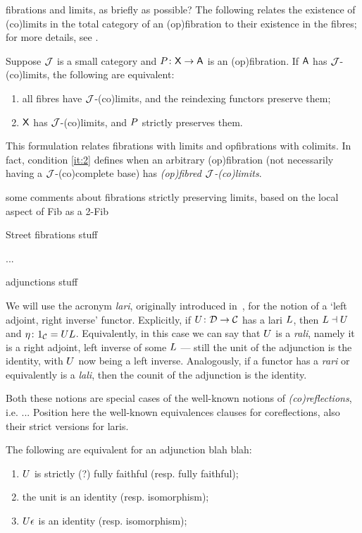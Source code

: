 \documentclass{amsart}
\begin{document}
{\chris fibrations and limits, as briefly as possible?}
The following relates the existence of (co)limits in the total category of an (op)fibration to their existence in the fibres; for more details, see \cite{hermidaphd}.

\begin{lem}\label{lem:fibrewiselimits}
Suppose $\ca{J}$ is a small category and $\P\colon\X\to\A$ is an (op)fibration. If $\A$ has $\ca{J}$-(co)limits,
the following are equivalent:
\begin{enumerate}
 \item all fibres have $\ca{J}$-(co)limits, and the reindexing functors preserve them;
 \item $\X$ has $\ca{J}$-(co)limits, and $\P$ strictly preserves them.\label{it:2}
\end{enumerate}
\end{lem}
This formulation relates fibrations with limits and opfibrations with colimits.
In fact, condition \ref{it:2} defines when an arbitrary (op)fibration (not necessarily having a $\ca{J}$-(co)complete base) has \emph{(op)fibred $\ca{J}$-(co)limits}.

{\chris some comments about fibrations strictly preserving limits, based on the local aspect of Fib as a 2-Fib}
\cite{Fib2Fib}

{\chris Street fibrations stuff}

...

{\chris adjunctions stuff}

We will use the acronym \emph{lari}, originally introduced in~\cite{Grayfibredandcofibred}, for the notion of a `left adjoint, right inverse' functor. Explicitly, if $\U\colon\ca{D}\to\ca{C}$ has a lari $\L$, then $\L\dashv \U$ and $\eta\colon1_\ca{C}=\U\L$. Equivalently, in this case we can say that $\U$ is a \emph{rali}, namely it is a right adjoint, left inverse of some $\L$ --- still the unit of the adjunction is the identity, with $\U$ now being a left inverse. Analogously, if a functor has a \emph{rari} or equivalently is a \emph{lali}, then the counit of the adjunction is the identity.

Both these notions are special cases of the well-known notions of \emph{(co)reflections}, i.e. ...
{\chris Position here the well-known equivalences clauses for coreflections, also their strict versions for laris.}
\begin{prop}\label{prop:coreflection}
 The following are equivalent for an adjunction blah blah:
 \begin{enumerate}
  \item $\U$ is strictly (?) fully faithful (resp. fully faithful);
  \item the unit is an identity (resp. isomorphism);
  \item $\\U\epsilon$ is an identity (resp. isomorphism);
 \end{enumerate}

\end{prop}
\end{document}
